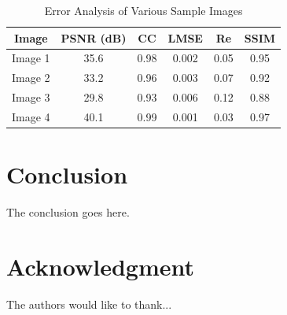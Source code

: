 \documentclass[conference]{IEEEtran}
\begin{document}
\begin{table}[htbp]
\caption{Error Analysis of Various Sample Images}
\centering
\begin{tabular}{|c|c|c|c|c|c|}
\hline
\textbf{Image} & \textbf{PSNR (dB)} & \textbf{CC} & \textbf{LMSE} & \textbf{Re} & \textbf{SSIM} \\
\hline
Image 1 & 35.6 & 0.98 & 0.002 & 0.05 & 0.95 \\
\hline
Image 2 & 33.2 & 0.96 & 0.003 & 0.07 & 0.92 \\
\hline
Image 3 & 29.8 & 0.93 & 0.006 & 0.12 & 0.88 \\
\hline
Image 4 & 40.1 & 0.99 & 0.001 & 0.03 & 0.97 \\
\hline
\end{tabular}
\label{tab:error_analysis}
\end{table}


\section{Conclusion}
The conclusion goes here.
\section*{Acknowledgment}
The authors would like to thank...



\end{document}
